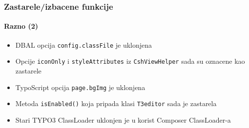 \begin{frame}[fragile]
	\frametitle{Zastarele/izbacene funkcije}
	\framesubtitle{Razno (2)}

	\begin{itemize}

		\item DBAL opcija \texttt{config.classFile} je uklonjena

		\item Opcije \texttt{iconOnly} i \texttt{styleAttributes} iz
			\texttt{CshViewHelper} sada su oznacene kao zastarele

		\item TypoScript opcija \texttt{page.bgImg} je uklonjena

		\item Metoda \texttt{isEnabled()} koja pripada klasi \texttt{T3editor} sada je zastarela

		\item Stari TYPO3 ClassLoader uklonjen je u korist Composer ClassLoader-a

	\end{itemize}

\end{frame}

